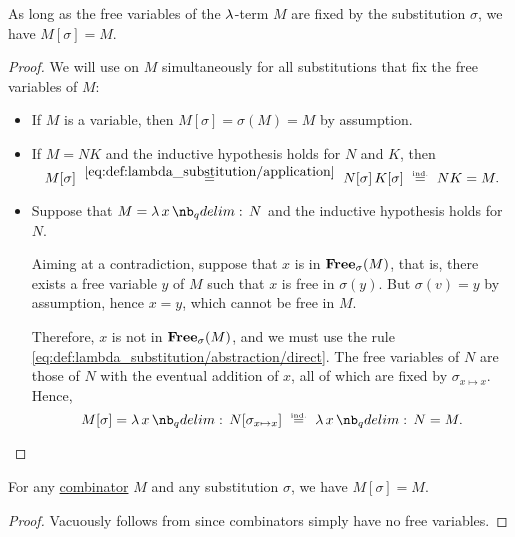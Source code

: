 \begin{proposition}\label{thm:lambda_substitution_noop}
  As long as the free variables of the \( \mathrm{\lambda} \)-term \( M \) are fixed by the substitution \( \sigma \), we have \( M[\sigma] = M \).
\end{proposition}
\begin{proof}
  We will use  on \( M \) simultaneously for all substitutions that fix the free variables of \( M \):
  \begin{itemize}
    \item If \( M \) is a variable, then \( M[\sigma] = \sigma(M) = M \) by assumption.
    \item If \( M = NK \) and the inductive hypothesis holds for \( N \) and \( K \), then
    \begin{equation*}
      M[\sigma]
      \reloset {\eqref{eq:def:lambda_substitution/application}} =
      N[\sigma] \thinspace K[\sigma]
      \reloset {\T{ind.}} =
      N K
      =
      M.
    \end{equation*}

    \item Suppose that \( M = \qabs x N \) and the inductive hypothesis holds for \( N \).

    Aiming at a contradiction, suppose that \( x \) is in \( \op*{Free}_\sigma(M) \), that is, there exists a free variable \( y \) of \( M \) such that \( x \) is free in \( \sigma(y) \). But \( \sigma(v) = y \) by assumption, hence \( x = y \), which cannot be free in \( M \).

    Therefore, \( x \) is not in \( \op*{Free}_\sigma(M) \), and we must use the rule \eqref{eq:def:lambda_substitution/abstraction/direct}. The free variables of \( N \) are those of \( N \) with the eventual addition of \( x \), all of which are fixed by \( \sigma_{x \mapsto x} \). Hence,
    \begin{equation*}
      M[\sigma]
      =
      \qabs x N[\sigma_{x \mapsto x}]
      \reloset {\T{ind.}} =
      \qabs x N
      =
      M.
    \end{equation*}
  \end{itemize}
\end{proof}

\begin{corollary}\label{thm:lambda_substitution_combinators}
  For any \hyperref[def:lambda_combinator]{combinator} \( M \) and any substitution \( \sigma \), we have \( M[\sigma] = M \).
\end{corollary}
\begin{proof}
  Vacuously follows from  since combinators simply have no free variables.
\end{proof}

